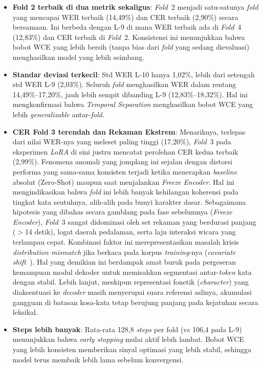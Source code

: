 \begin{itemize}
    \item \textbf{Fold 2 terbaik di dua metrik sekaligus}: \textit{Fold}~2 menjadi satu-satunya \textit{fold} yang mencapai WER terbaik (14,49\%) dan CER terbaik (2,90\%) secara bersamaan. Ini berbeda dengan L-9 di mana WER terbaik ada di \textit{Fold}~4 (12,83\%) dan CER terbaik di \textit{Fold}~2. Konsistensi ini menunjukkan bahwa bobot WCE yang lebih bersih (tanpa bias dari \textit{fold} yang sedang dievaluasi) menghasilkan model yang lebih seimbang.

    \item \textbf{Standar deviasi terkecil}: Std WER L-10 hanya 1,02\%, lebih dari setengah std WER L-9 (2,03\%). Seluruh \textit{fold} menghasilkan WER dalam rentang 14,49\%--17,20\%, jauh lebih sempit dibanding L-9 (12,83\%--18,32\%). Hal ini mengkonfirmasi bahwa \textit{Temporal Separation} menghasilkan bobot WCE yang lebih \textit{generalizable} antar-\textit{fold}.

    \item \textbf{CER Fold 3 terendah dan Rekaman Ekstrem}: Menariknya, terlepas dari nilai WER-nya yang meleset paling tinggi (17,20\%), \textit{Fold}~3 pada eksperimen \textit{LoRA} di sini justru mencatat perolehan CER kedua terbaik (2,99\%). Fenomena anomali yang jomplang ini sejalan dengan distorsi performa yang sama-sama konsisten terjadi ketika menerapkan \textit{baseline} absolut (Zero-Shot) maupun saat menjalankan \textit{Freeze Encoder}. Hal ini mengindikasikan bahwa \textit{fold} ini lebih banyak kehilangan koherensi pada tingkat kata seutuhnya, alih-alih pada bunyi karakter dasar. Sebagaimana hipotesis yang dibahas secara gamblang pada fase sebelumnya (\textit{Freeze Encoder}), \textit{Fold}~3 sangat didominasi oleh set rekaman yang berdurasi panjang ($>$14 detik), logat daerah pedalaman, serta laju interaksi wicara yang terlampau cepat. Kombinasi faktor ini merepresentasikan masalah krisis \textit{distribution mismatch} jika berkaca pada korpus \textit{training}-nya (\textit{covariate shift}~\cite{sugiyama2007covariate}). Hal yang demikian ini berdampak amat buruk pada pergeseran kemampuan modul dekoder untuk memisahkan segmentasi antar-\textit{token} kata dengan stabil. Lebih lanjut, meskipun representasi fonetik (\textit{character}) yang diaksentuasi ke \textit{decoder} masih menyerupai suara referensi aslinya, akumulasi gangguan di batasan kosa-kata tetap berujung panjang pada kejatuhan secara leksikal.

    \item \textbf{Steps lebih banyak}: Rata-rata 128,8 \textit{steps} per fold (vs 106,4 pada L-9) menunjukkan bahwa \textit{early stopping} mulai aktif lebih lambat. Bobot WCE yang lebih konsisten memberikan sinyal optimasi yang lebih stabil, sehingga model terus membaik lebih lama sebelum konvergensi.
\end{itemize}

